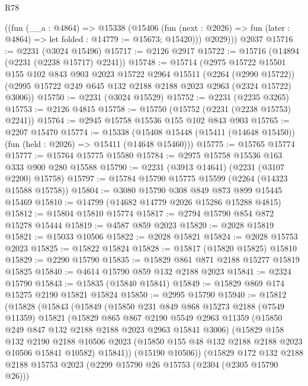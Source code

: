 \begin{lexlean}{R78}
\begin{coremodule}
        ((fun (__a : @4864) =>
        @15338
          (@15406
            (fun (next : @2026) => fun (later : @4864) => let folded : @14779 := @15673; @15420)))
          @2029)))
    @2037
@15716 := @2231 (@3024 @15496)
@15717 := @2126 @2917
@15722 := @15716 (@14894 (@2231 (@2238 @15717) @2241))
@15748 := @15714
    (@2975
      @15722
      @15501
      @155
      @102
      @843
      @903
      @2023
      @15722
      @2964
      @15511
      (@2264 (@2990 @15722))
      (@2995 @15722 @249 @645 @132 @2188 @2188 @2023 @2963 (@2324 @15722) @3006))
@15750 := @2231 (@3024 @15529)
@15752 := @2231 (@2235 @3265)
@15753 := @2126 @4815
@15758 := @15750 (@15752 (@2231 (@2238 @15753) @2241))
@15764 := @2945 @15758 @15536 @155 @102 @843 @903
@15765 := @2207 @15470
@15774 := @15338
    (@15408 @15448 (@15411 (@14648 @15450)) (fun (held : @2026) => @15411 (@14648 @15460)))
@15775 := @15765 @15774
@15777 := @15764 @15775 @15580
@15784 := @2975 @15758 @15536 @163 @333 @900 @280 @15588
@15790 := @2231 (@3913 @14641) (@2231 (@3107 @2200) @15758)
@15797 := @15784 @15790 @15775 @15599 (@2264 (@14323 @15588 @15758))
@15804 := @3080 @15790 @308 @849 @873 @899 @15445 @15469
@15810 := @14799 (@14682 @14779 @2026 @15286 @15288 @4815)
@15812 := @15804 @15810 @15774
@15817 := @2794 @15790 @854 @872 @15278 @15444
@15819 := @4587 @859 @2023
@15820 := @2028 @15819
@15821 := @15033 @10506
@15822 := @2028 @15821
@15824 := @2028 @15753 @2023
@15825 := @15822 @15824
@15828 := @15817 (@15820 @15825) @15810
@15829 := @2290 @15790
@15835 := @15829 @861 @871 @2188 @15277 @15819 @15825
@15840 := @4614 @15790 @859 @132 @2188 @2023
@15841 := @2324 @15790
@15843 := @15835 (@15840 @15841)
@15849 := @15829 @869 @174 @15275 @2190 @15821 @15824
@15850 := @2995 @15790
@15940 := @15812
    (@15828
      (@15843
        (@15849
          (@15850
            @231
            @849
            @868
            @15273
            @2188
            (@7549 @11359)
            @15821
            (@15829
              @865
              @867
              @2190
              @5549
              @2963
              @11359
              (@15850 @249 @847 @132 @2188 @2188 @2023 @2963 @15841 @3006)
              (@15829
                @158
                @132
                @2190
                @2188
                @10506
                @2023
                (@15850 @155 @48 @132 @2188 @2188 @2023 @10506 @15841 @10582)
                @15841))
            (@15190 @10506))
          (@15829
            @172
            @132
            @2188
            @2188
            @15753
            @2023
            (@2299 @15790 @26 @15753 (@2304 (@2305 @15790 @26)))

\end{coremodule}
\end{lexlean}
